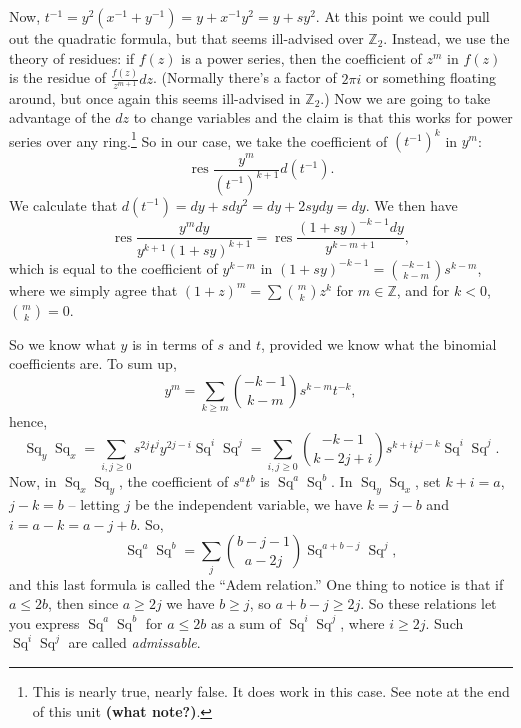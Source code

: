 \documentclass{article}
\newcommand{\Z}{\mathbb{Z}}
\DeclareMathOperator{\res}{res}
\DeclareMathOperator{\Sq}{Sq}
\begin{document}
Now, $t^{-1} = y^2(x^{-1} + y^{-1}) = y + x^{-1} y^2 = y + s y^2$.  At this point we could pull out the quadratic formula, but that seems ill-advised over $\Z_2$.  Instead, we use the theory of residues: if $f(z)$ is a power series, then the coefficient of $z^m$ in $f(z)$ is the residue of $\frac{f(z)}{z^{m+1}}dz$.  (Normally there's a factor of $2 \pi i$ or something floating around, but once again this seems ill-advised in $\Z_2$.)  Now we are going to take advantage of the $dz$ to change variables and the claim is that this works for power series over any ring.\footnote{This is nearly true, nearly false.  It does work in this case.  See note at the end of this unit \textbf{(what note?)}. %
}  So in our case, we take the coefficient of $(t^{-1})^k$ in $y^m$: \[\res \frac{y^m}{(t^{-1})^{k+1}} d(t^{-1}).\]  We calculate that $d(t^{-1}) = dy + sdy^2 = dy + 2sydy = dy$.  We then have \[\res \frac{y^m dy}{y^{k+1}(1 + sy)^{k+1}} = \res \frac{(1+sy)^{-k-1} dy}{y^{k-m+1}},\] which is equal to the coefficient of $y^{k-m}$ in $(1+sy)^{-k-1} = \binom{-k-1}{k-m}s^{k-m}$, where we simply agree that $(1 + z)^m = \sum \binom{m}{k} z^k$ for $m \in \Z$, and for $k < 0$, $\binom{m}{k} = 0$.

So we know what $y$ is in terms of $s$ and $t$, provided we know what the binomial coefficients are.  To sum up,
\[
y^m = \sum_{k \ge m} \binom{-k-1}{k-m} s^{k-m} t^{-k}
,\]
hence,
\[
\Sq_y \Sq_x = \sum_{i, j \ge 0} s^{2j} t^j y^{2j-i} \Sq^i \Sq^j = \sum_{i, j \ge 0} \binom{-k-1}{k-2j+i} s^{k+i}t^{j-k}\Sq^i\Sq^j
.\]
Now, in $\Sq_x \Sq_y$, the coefficient of $s^a t^b$ is $\Sq^a \Sq^b$.  In $\Sq_y \Sq_x$, set $k + i = a$, $j - k = b$ -- letting $j$ be the independent variable, we have $k = j - b$ and $i = a - k = a - j + b$.  So,
\[
\Sq^a \Sq^b = \sum_j \binom{b-j-1}{a-2j} \Sq^{a+b-j} \Sq^j
,\]
and this last formula is called the ``Adem relation.''  One thing to notice is that if $a \le 2b$, then since $a \ge 2j$ we have $b \ge j$, so $a + b -j \ge 2j$.  So these relations let you express $\Sq^a \Sq^b$ for $a \le 2b$ as a sum of $\Sq^i \Sq^j$, where $i \ge 2j$.  Such $\Sq^i \Sq^j$ are called \emph{admissable}.
\end{document}
